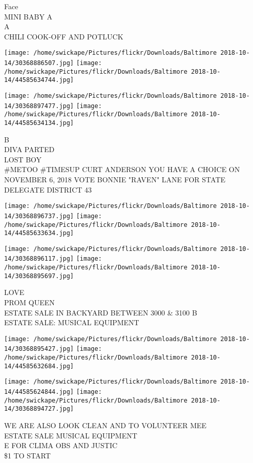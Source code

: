 \documentclass[10pt,letterpaper]{article}
\begin{document}
Face\\
MINI BABY A\\
A\\
CHILI COOK{-}OFF AND POTLUCK
\pagebreak

\texttt{[image: /home/swickape/Pictures/flickr/Downloads/Baltimore 2018-10-14/30368886507.jpg]}
\texttt{[image: /home/swickape/Pictures/flickr/Downloads/Baltimore 2018-10-14/44585634744.jpg]}

\texttt{[image: /home/swickape/Pictures/flickr/Downloads/Baltimore 2018-10-14/30368897477.jpg]}
\texttt{[image: /home/swickape/Pictures/flickr/Downloads/Baltimore 2018-10-14/44585634134.jpg]}

B\\
DIVA PARTED\\
LOST BOY\\
\#METOO \#TIMESUP CURT ANDERSON YOU HAVE A CHOICE ON NOVEMBER 6, 2018 VOTE BONNIE "RAVEN" LANE FOR STATE DELEGATE DISTRICT 43
\pagebreak

\texttt{[image: /home/swickape/Pictures/flickr/Downloads/Baltimore 2018-10-14/30368896737.jpg]}
\texttt{[image: /home/swickape/Pictures/flickr/Downloads/Baltimore 2018-10-14/44585633634.jpg]}

\texttt{[image: /home/swickape/Pictures/flickr/Downloads/Baltimore 2018-10-14/30368896117.jpg]}
\texttt{[image: /home/swickape/Pictures/flickr/Downloads/Baltimore 2018-10-14/30368895697.jpg]}

LOVE\\
PROM QUEEN\\
ESTATE SALE IN BACKYARD BETWEEN 3000 \& 3100 B\\
ESTATE SALE: MUSICAL EQUIPMENT
\pagebreak

\texttt{[image: /home/swickape/Pictures/flickr/Downloads/Baltimore 2018-10-14/30368895427.jpg]}
\texttt{[image: /home/swickape/Pictures/flickr/Downloads/Baltimore 2018-10-14/44585632684.jpg]}

\texttt{[image: /home/swickape/Pictures/flickr/Downloads/Baltimore 2018-10-14/44585624844.jpg]}
\texttt{[image: /home/swickape/Pictures/flickr/Downloads/Baltimore 2018-10-14/30368894727.jpg]}

WE ARE ALSO LOOK CLEAN AND TO VOLUNTEER MEE\\
ESTATE SALE MUSICAL EQUIPMENT\\
E FOR CLIMA OBS AND JUSTIC\\
\$1 TO START
\pagebreak
\end{document}
